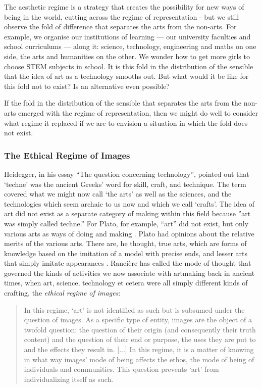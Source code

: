 \documentclass[letterpaper]{article}
\begin{document}
    The aesthetic regime is a strategy that creates the possibility for new ways of being in the world, cutting across the regime of representation - but we still observe the fold of difference that separates the arts from the non-arts. For example, we organise our institutions of learning — our university faculties and school curriculums — along it: science, technology, engineering and maths on one side, the arts and humanities on the other. We wonder how to get more girls to choose STEM subjects in school. It is this fold in the distribution of the sensible that the idea of art as a technology smooths out. But what would it be like for this fold not to exist? Is an alternative even possible?

    If the fold in the distribution of the sensible that separates the arts from the non-arts emerged with the regime of representation, then we might do well to consider what regime it replaced if we are to envision a situation in which the fold does not exist.
    
    \subsubsection{The Ethical Regime of Images}

    Heidegger, in his essay “The question concerning technology”, pointed out that ‘techne’ was the ancient Greeks' word for skill, craft, and technique. The term covered what we might now call ‘the arts’ as well as the sciences, and the technologies which seem archaic to us now and which we call ‘crafts’. The idea of art did not exist as a separate category of making within this field because ”art was simply called techne.” \citep[p34]{HeideggerThQstnCncrngTchnlgy1954} For Plato, for example, “art” did not exist, but only various arts as ways of doing and making \citep[p.20]{RancierPltcsOfThAsthtcs2004}. Plato had opinions about the relative merits of the various arts. There are, he thought, true arts, which are forms of knowledge based on the imitation of a model with precise ends, and lesser arts that simply imitate appearances \citep[p.20]{RancierPltcsOfThAsthtcs2004}.  Rancière has called the mode of thought that governed the kinds of activities we now associate with artmaking back in ancient times, when art, science, technology et cetera were all simply different kinds of crafting, the \emph{ethical regime of images}:

    \begin{quote}
        In this regime, ‘art’ is not identified as such but is subsumed under the question of images. As a specific type of entity, images are the object of a twofold question: the question of their origin (and consequently their truth content) and the question of their end or purpose, the uses they are put to and the effects they result in. [...] In this regime, it is a matter of knowing in what way images' mode of being affects the ethos, the mode of being of individuals and communities. This question prevents ‘art’ from individualizing itself as such. \citep[pp.20-21]{RancierPltcsOfThAsthtcs2004}
    \end{quote}
\end{document}
